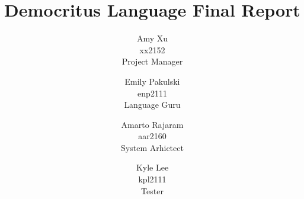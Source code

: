\documentclass{report}
\author{
  Amy Xu \\ \small{xx2152} \\ \small{Project Manager} 
  \and Emily Pakulski \\ \small{enp2111} \\ \small{Language Guru} 
  \and Amarto Rajaram \\ \small{aar2160}  \\ \small{System Arhictect} 
  \and Kyle Lee\\ \small{kpl2111} \\ \small{Tester}
}
\title{Democritus Language Final Report}
\begin{document}
	\maketitle
	\tableofcontents
	\pagebreak
  
  
  
  
  
  
  
  
  
\end{document}
